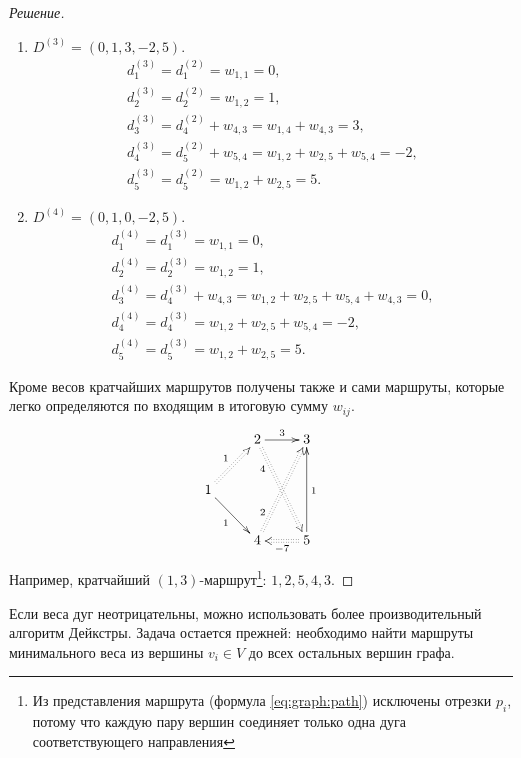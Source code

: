 \begin{proof}[Решение]
\begin{enumerate}
        \item $D^{(3)}=(0,1,3,-2,5)$. 
        \[
            \begin{split}
                d_1^{(3)}=d_1^{(2)}=w_{1,1}=0,\\
                d_2^{(3)}=d_2^{(2)}=w_{1,2}=1,\\
                d_3^{(3)}=d_4^{(2)}+w_{4,3}=w_{1,4}+w_{4,3}=3,\\
                d_4^{(3)}=d_5^{(2)}+w_{5,4}=w_{1,2}+w_{2,5}+w_{5,4}=-2,\\
                d_5^{(3)}=d_5^{(2)}=w_{1,2}+w_{2,5}=5.
            \end{split}
        \]
        
        \item $D^{(4)}=(0,1,0,-2,5)$. 
        \[
            \begin{split}
                d_1^{(4)}=d_1^{(3)}=w_{1,1}=0,\\
                d_2^{(4)}=d_2^{(3)}=w_{1,2}=1,\\
                d_3^{(4)}=d_4^{(3)}+w_{4,3}=w_{1,2}+w_{2,5}+w_{5,4}+w_{4,3}=0,\\
                d_4^{(4)}=d_4^{(3)}=w_{1,2}+w_{2,5}+w_{5,4}=-2,\\
                d_5^{(4)}=d_5^{(3)}=w_{1,2}+w_{2,5}=5.
            \end{split}
        \]        
    \end{enumerate}
    
    Кроме весов кратчайших маршрутов получены также и сами маршруты, которые легко определяются по входящим в итоговую сумму $w_{ij}$. 
    \[    
        {\xymatrix{
            *{}
                &2 \ar@{->}[r]^3 \ar@{:>}[ddr]_(.25){4}
                    &3
                        \\
            1 \ar@{:>}[ur]^1 \ar@{->}[dr]_1
                &*{}
                    &*{}
                        \\
            *{}
                &4 \ar@{:>}[uur]^(.25){2}
                    &5 \ar@{:>}[l]^{-7} \ar@{->}[uu]_{1}
        }}
    \]        
    Например, кратчайший $(1,3)$-маршрут\footnote{Из представления маршрута (формула \eqref{eq:graph:path}) исключены отрезки $p_i$, потому что каждую пару вершин соединяет только одна дуга соответствующего направления}: $1,2,5,4,3$.
\end{proof}

Если веса дуг неотрицательны, можно использовать более производительный алгоритм Дейкстры. Задача остается прежней: необходимо найти маршруты минимального веса из вершины $v_i\in V$ до всех остальных вершин графа.
